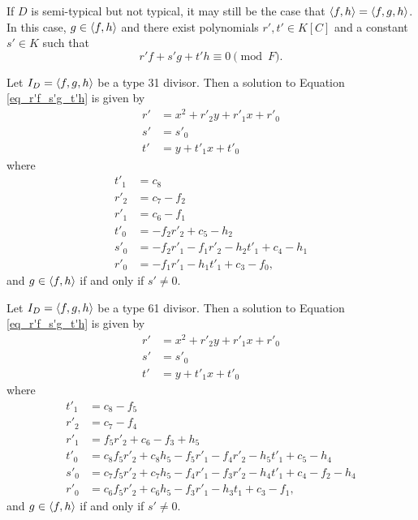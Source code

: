 If $D$ is semi-typical but not typical,
it may still be the case that $\left\langle f,h \right\rangle = \left\langle f,g,h \right\rangle$.
In this case, $g \in \left\langle f,h \right\rangle$ and there exist polynomials $r', t' \in K[C]$ and a constant $s' \in K$ such that
\begin{equation}
  \label{eq_r'f_s'g_t'h}
  r'f + s'g + t'h \equiv 0 \pmod F.
\end{equation}
\begin{lemma}
  \label{lem_fgh_is_fh_31}
  Let $I_D = \left\langle f,g,h \right\rangle$ be a type 31 divisor.
  Then a solution to Equation \ref{eq_r'f_s'g_t'h} is given by
  \begin{align*}
    r' &= x^2 + r'_2y + r'_1x + r'_0 \\
    s' &= s'_0 \\
    t' &= y + t'_1x + t'_0
  \end{align*}
  where
  \begin{align*}
    t'_1 &= c_8 \\
    r'_2 &= c_7 - f_2\\
    r'_1 &= c_6 - f_1 \\
    t'_0 &= -f_2r'_2 + c_5 - h_2 \\
    s'_0 &= -f_2r'_1 - f_1r'_2 - h_2t'_1 + c_4 - h_1 \\
    r'_0 &= -f_1r'_1 - h_1t'_1 + c_3 - f_0,
  \end{align*}
  and $g \in \left\langle f,h \right\rangle$ if and only if $s' \neq 0$.
\end{lemma}
\begin{lemma}
  \label{lem_fgh_is_fh_61}
  Let $I_D = \left\langle f,g,h \right\rangle$ be a type 61 divisor.
  Then a solution to Equation \ref{eq_r'f_s'g_t'h} is given by
  \begin{align*}
    r' &= x^2 + r'_2y + r'_1x + r'_0 \\
    s' &= s'_0 \\
    t' &= y + t'_1x + t'_0
  \end{align*}
  where
  \begin{align*}
    t'_1 &= c_8 - f_5 \\
    r'_2 &= c_7 - f_4\\
    r'_1 &= f_5r'_2 + c_6 - f_3 + h_5 \\
    t'_0 &= c_8f_5r'_2 + c_8h_5 - f_5r'_1 - f_4r'_2 - h_5t'_1 + c_5 - h_4 \\
    s'_0 &= c_7f_5r'_2 + c_7h_5 - f_4r'_1 - f_3r'_2 - h_4t'_1 + c_4 - f_2 - h_4 \\
    r'_0 &= c_6f_5r'_2 + c_6h_5 - f_3r'_1 - h_3t_1 + c_3 - f_1,
  \end{align*}
  and $g \in \left\langle f,h \right\rangle$ if and only if $s' \neq 0$.
\end{lemma}



